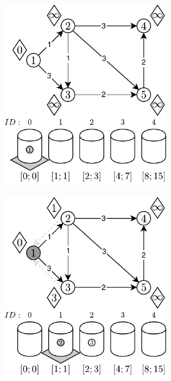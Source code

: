 \begin{figure}[!ht]
	\centering
	\begin{subfigure}[b]{\textwidth}
		\null\hfill
		\begin{subfigure}[b]{0.32\textwidth}
			\includegraphics[width=\textwidth]{Chapter_II/RADIX-HEAP-NC-Example/a.pdf}
			\caption{}
			\label{fig:exampleRadixHeapNC:a}
		\end{subfigure}
		\hfill
		\begin{subfigure}[b]{0.32\textwidth}
			\includegraphics[width=\textwidth]{Chapter_II/RADIX-HEAP-NC-Example/b.pdf}

\end{subfigure}
\end{subfigure}
\end{figure}
